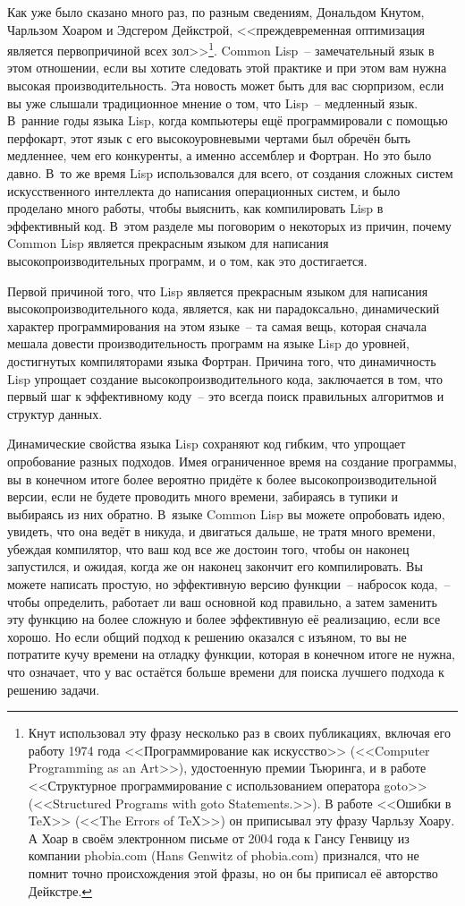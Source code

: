 Как уже было сказано много раз, по разным сведениям, Дональдом Кнутом, Чарльзом Хоаром и
Эдсгером Дейкстрой, <<преждевременная оптимизация является первопричиной всех
зол>>\footnote{Кнут использовал эту фразу несколько раз в своих публикациях, включая его
  работу 1974 года <<Программирование как искусство>> (<<Computer Programming as an
  Art>>), удостоенную премии Тьюринга, и в работе <<Структурное программирование с
  использованием оператора goto>> (<<Structured Programs with goto Statements.>>). В
  работе <<Ошибки в TeX>> (<<The Errors of TeX>>) он приписывал эту фразу Чарльзу Хоару.
  А Хоар в своём электронном письме от 2004 года к Гансу Генвицу из компании phobia.com
  (Hans Genwitz of phobia.com) признался, что не помнит точно происхождения этой фразы, но
  он бы приписал её авторство Дейкстре.}. Common Lisp~-- замечательный язык в этом
отношении, если вы хотите следовать этой практике и при этом вам нужна высокая
производительность. Эта новость может быть для вас сюрпризом, если вы уже слышали
традиционное мнение о том, что Lisp~-- медленный язык. В~ранние годы языка Lisp, когда
компьютеры ещё программировали с помощью перфокарт, этот язык с его высокоуровневыми
чертами был обречён быть медленнее, чем его конкуренты, а именно ассемблер и Фортран. Но
это было давно. В~то же время Lisp использовался для всего, от создания сложных систем
искусственного интеллекта до написания операционных систем, и было проделано много
работы, чтобы выяснить, как компилировать Lisp в эффективный код.  В~этом разделе мы
поговорим о некоторых из причин, почему Common Lisp является прекрасным языком для
написания высокопроизводительных программ, и о том, как это достигается.

Первой причиной того, что Lisp является прекрасным языком для написания
высокопроизводительного кода, является, как ни парадоксально, динамический характер
программирования на этом языке~-- та самая вещь, которая сначала мешала довести
производительность программ на языке Lisp до уровней, достигнутых компиляторами языка
Фортран. Причина того, что динамичность Lisp упрощает создание высокопроизводительного
кода, заключается в том, что первый шаг к эффективному коду~-- это всегда поиск
правильных алгоритмов и структур данных.

Динамические свойства языка Lisp сохраняют код гибким, что упрощает опробование разных
подходов. Имея ограниченное время на создание программы, вы в конечном итоге более
вероятно придёте к более высокопроизводительной версии, если не будете проводить много
времени, забираясь в тупики и выбираясь из них обратно. В~языке Common Lisp вы можете
опробовать идею, увидеть, что она ведёт в никуда, и двигаться дальше, не тратя много
времени, убеждая компилятор, что ваш код все же достоин того, чтобы он наконец запустился,
и ожидая, когда же он наконец закончит его компилировать. Вы можете написать простую, но
эффективную версию функции~-- набросок кода,~-- чтобы определить, работает ли ваш
основной код правильно, а затем заменить эту функцию на более сложную и более эффективную
её реализацию, если все хорошо. Но если общий подход к решению оказался с изъяном, то вы
не потратите кучу времени на отладку функции, которая в конечном итоге не нужна, что
означает, что у вас остаётся больше времени для поиска лучшего подхода к решению задачи.

